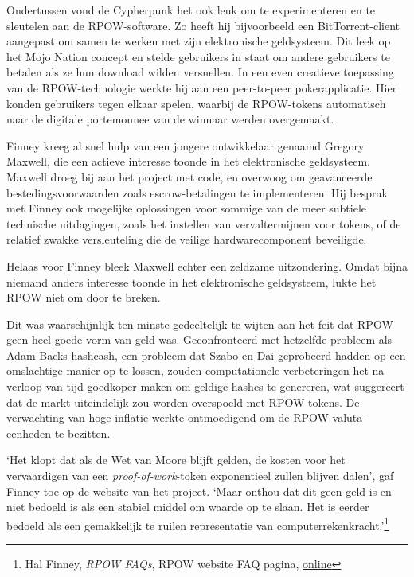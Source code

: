 \documentclass[
  a5paper,
  smalldemyvopaper,11pt,twoside,onecolumn,openright,extrafontsizes,
hidelinks]{memoir}
\begin{document}
Ondertussen vond de Cypherpunk het ook leuk om te experimenteren en te
sleutelen aan de RPOW-software. Zo heeft hij bijvoorbeeld een
BitTorrent-client aangepast om samen te werken met zijn elektronische
geldsysteem. Dit leek op het Mojo Nation concept en stelde gebruikers in
staat om andere gebruikers te betalen als ze hun download wilden
versnellen. In een even creatieve toepassing van de RPOW-technologie
werkte hij aan een peer-to-peer pokerapplicatie. Hier konden gebruikers
tegen elkaar spelen, waarbij de RPOW-tokens automatisch naar de digitale
portemonnee van de winnaar werden overgemaakt.

Finney kreeg al snel hulp van een jongere ontwikkelaar genaamd Gregory
Maxwell, die een actieve interesse toonde in het elektronische
geldsysteem. Maxwell droeg bij aan het project met code, en overwoog om
geavanceerde bestedingsvoorwaarden zoals escrow-betalingen te
implementeren. Hij besprak met Finney ook mogelijke oplossingen voor
sommige van de meer subtiele technische uitdagingen, zoals het instellen
van vervaltermijnen voor tokens, of de relatief zwakke versleuteling die
de veilige hardwarecomponent beveiligde.

Helaas voor Finney bleek Maxwell echter een zeldzame uitzondering. Omdat
bijna niemand anders interesse toonde in het elektronische geldsysteem,
lukte het RPOW niet om door te breken.

Dit was waarschijnlijk ten minste gedeeltelijk te wijten aan het feit
dat RPOW geen heel goede vorm van geld was. Geconfronteerd met hetzelfde
probleem als Adam Backs hashcash, een probleem dat Szabo en Dai
geprobeerd hadden op een omslachtige manier op te lossen, zouden
computationele verbeteringen het na verloop van tijd goedkoper maken om
geldige hashes te genereren, wat suggereert dat de markt uiteindelijk
zou worden overspoeld met RPOW-tokens. De verwachting van hoge inflatie
werkte ontmoedigend om de RPOW-valuta-eenheden te bezitten.

`Het klopt dat als de Wet van Moore blijft gelden, de kosten voor het
vervaardigen van een \emph{proof-of-work}-token exponentieel zullen
blijven dalen', gaf Finney toe op de website van het project. `Maar
onthou dat dit geen geld is en niet bedoeld is als een stabiel middel om
waarde op te slaan. Het is eerder bedoeld als een gemakkelijk te ruilen
representatie van computerrekenkracht.'\footnote{Hal Finney, \emph{RPOW
  FAQs}, RPOW website FAQ pagina,
  \href{https://web.archive.org/web/20090217090439/http://rpow.net/faqs.html\#inflation}{online}}
\end{document}
